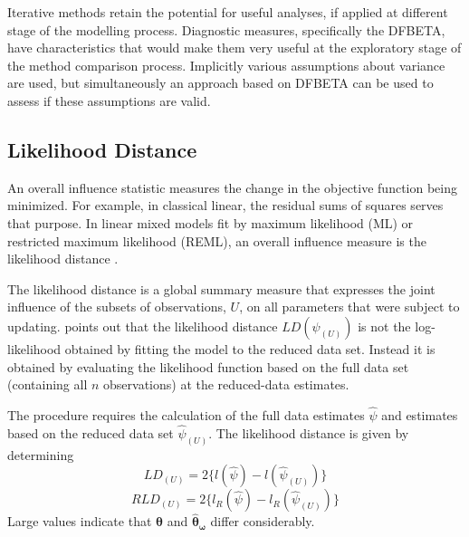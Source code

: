 \documentclass[12pt, a4paper]{report}
\theoremstyle{plain}
\theoremstyle{definition}
\theoremstyle{remark}
\begin{document}
Iterative methods retain the potential for useful analyses, if applied at different stage of the modelling process. Diagnostic measures, specifically the DFBETA, have characteristics that would make them very useful at the exploratory stage of the method comparison process. Implicitly various assumptions about variance are used, but simultaneously an approach based on DFBETA can be used to assess if these assumptions are valid.



\subsection{Likelihood Distance}
An overall influence statistic measures the change in the objective function being minimized. For example, in
classical linear, the residual sums of squares serves that purpose. In linear mixed models fit by
 maximum likelihood (ML) or  restricted maximum likelihood (REML), an overall influence measure is the  likelihood distance \citep{CookWeisberg}.


The  likelihood distance is a global summary measure that expresses the joint influence of the subsets of observations, $U$, on all parameters that were subject to updating. \citet{schabenberger} points out that the likelihood distance $LD(\psi_{(U)})$ is not the log-likelihood obtained by fitting the model to the reduced data set. Instead it is obtained by evaluating the likelihood function based on the full data set (containing all $n$ observations) at the reduced-data estimates.





 The
procedure requires the calculation of the full data estimates
$\hat{\psi}$ and estimates based on the reduced data set
$\hat{\psi}_{(U)}$. The likelihood distance is given by
determining
\[
LD_{(U)} = 2\{l(\hat{\psi}) - l( \hat{\psi}_{(U)}) \}\]\[
RLD_{(U)} = 2\{l_{R}(\hat{\psi}) - l_{R}(\hat{\psi}_{(U)})\}
\]
Large values indicate that $\boldsymbol{\hat{\theta}}$ and $\boldsymbol{\hat{\theta}_\omega}$ differ considerably.
\end{document}
